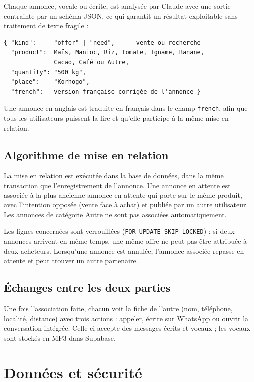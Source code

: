 \documentclass[12pt,a4paper]{article}
\begin{document}
Chaque annonce, vocale ou écrite, est analysée par Claude avec une sortie contrainte par un schéma
JSON, ce qui garantit un résultat exploitable sans traitement de texte fragile :

\begin{Verbatim}[fontsize=\small]
{ "kind":     "offer" | "need",      vente ou recherche
  "product":  Maïs, Manioc, Riz, Tomate, Igname, Banane,
              Cacao, Café ou Autre,
  "quantity": "500 kg",
  "place":    "Korhogo",
  "french":   version française corrigée de l'annonce }
\end{Verbatim}

Une annonce en anglais est traduite en français dans le champ \texttt{french}, afin que tous les
utilisateurs puissent la lire et qu'elle participe à la même mise en relation.

\subsection{Algorithme de mise en relation}

La mise en relation est exécutée dans la base de données, dans la même transaction que
l'enregistrement de l'annonce. Une annonce en attente est associée à la plus ancienne annonce en
attente qui porte sur le même produit, avec l'intention opposée (vente face à achat) et publiée par
un autre utilisateur. Les annonces de catégorie \og Autre \fg{} ne sont pas associées
automatiquement.

Les lignes concernées sont verrouillées (\texttt{FOR UPDATE SKIP LOCKED}) : si deux annonces arrivent
en même temps, une même offre ne peut pas être attribuée à deux acheteurs. Lorsqu'une annonce est
annulée, l'annonce associée repasse en attente et peut trouver un autre partenaire.

\subsection{Échanges entre les deux parties}

Une fois l'association faite, chacun voit la fiche de l'autre (nom, téléphone, localité, distance)
avec trois actions : appeler, écrire sur WhatsApp ou ouvrir la conversation intégrée. Celle-ci
accepte des messages écrits et vocaux ; les vocaux sont stockés en MP3 dans Supabase.

\section{Données et sécurité}
\end{document}
